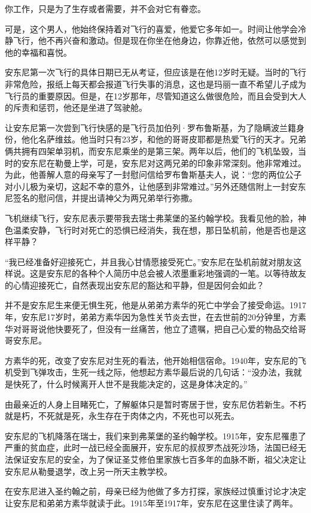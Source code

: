 你工作，只是为了生存或者需要，并不会对它有眷恋。

可是，这个男人，他始终保持着对飞行的喜爱，他爱它多年如一。时间让他学会冷静飞行，他不再兴奋和激动。但是现在你坐在他身边，你靠近他，依然可以感觉到他的幸福和喜悦。

安东尼第一次飞行的具体日期已无从考证，但应该是在他12岁时无疑。当时的飞行非常危险，报纸上每天都会报道飞行失事的消息，这也是玛丽一直不希望儿子成为飞行员的重要原因。但是，在12岁那年，尽管知道这么做很危险，而且会受到大人的斥责和惩罚，他还是坐进了驾驶舱。

让安东尼第一次尝到飞行快感的是飞行员加伯列·罗布鲁斯基，为了隐瞒波兰籍身份，他化名萨维兹。他当时只有23岁，和他的哥哥皮耶都是热爱飞行的天才。兄弟俩共拥有四架单羽机，而安东尼乘坐的是第三架。两年以后，他们的飞机坠毁，当时的安东尼在勒曼上学，可是，安东尼对这两兄弟的印象非常深刻。他非常难过。为此，他善解人意的母亲写了一封慰问信给罗布鲁斯基夫人，说：“您的两位公子对小儿极为亲切，这起不幸的意外，让他感到非常难过。”另外还随信附上一封安东尼签名的慰问信，并提出请神父为两兄弟举行弥撒。

飞机继续飞行，安东尼表示要带我去瑞士弗莱堡的圣约翰学校。我看见他的脸，神色温柔安静，飞行时对死亡的恐惧已经消失，我在想，那日坠机前，他是否也是这样平静？

“我已经准备好迎接死亡，并且我心甘情愿接受死亡。”安东尼在坠机前就对朋友这样说。这是安东尼的各种个人简历中总会被人浓墨重彩地强调的一笔。以等待故友的心情迎接死亡，自然表现出安东尼的豁达和平静，但是因何会如此？

并不是安东尼生来便无惧生死，他是从弟弟方素华的死亡中学会了接受命运。1917年，安东尼17岁时，弟弟方素华因为急性关节炎去世，在去世前的20分钟里，方素华对哥哥说他快要死了，但没有一丝痛苦，他立了遗嘱，把自己心爱的物品交给哥哥安东尼。

方素华的死，改变了安东尼对生死的看法，他开始相信宿命。1940年，安东尼的飞机受到飞弹攻击，生死一线之际，他想起方素华最后说的几句话：“没办法，我就是快死了，什么时候离开人世不是我能决定的，这是身体决定的。”

由最亲近的人身上目睹死亡，了解躯体只是暂时寄居于世，安东尼仿若新生。不朽就是朽，不死就是死，永生存在于肉体之内，不死也可以死去。

安东尼的飞机降落在瑞士，我们来到弗莱堡的圣约翰学校。1915年，安东尼罹患了严重的贫血症，此时一战已经全面展开，安东尼的叔叔罗杰战死沙场，法国已经无法保证安东尼的安全，为了保证圣艾修伯里家族七百多年的血脉不断，祖父决定让安东尼从勒曼退学，改上另一所天主教学校。

在安东尼进入圣约翰之前，母亲已经为他做了多方打探，家族经过慎重讨论才决定让安东尼和弟弟方素华就读于此。1915年至1917年，安东尼在这里住读了两年。

